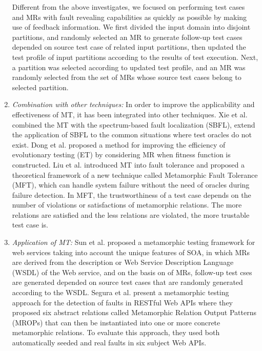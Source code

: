 \documentclass[conference]{IEEEtran}
\theoremstyle{remark}
\begin{document}
\begin{enumerate}[1]
  Different from the above investigates, we focused on performing test cases and MRs with fault revealing capabilities as quickly as possible by making use of feedback information. We first divided the input domain into disjoint partitions, and randomly selected an MR to generate follow-up test cases depended on source test case of related input partitions, then updated the test profile of input partitions according to the results of test execution. Next, a partition was selected according to updated test profile, and an MR was randomly selected from the set of MRs whose source test cases belong to selected partition.
  \item
  \emph{Combination with other techniques:} In order to improve the applicability and effectiveness of MT, it has been integrated into other techniques.
  Xie et al. \cite{xie2013metamorphic} combined the MT with the spectrum-based fault localization (SBFL), extend the application of SBFL to the common situations where test oracles do not exist.
  Dong et al. \cite{dong2010security} proposed a method for improving the efficiency of evolutionary testing (ET) by considering MR when fitness function is constructed.
  Liu et al. \cite{liu2014metamorphic} introduced MT into fault tolerance and proposed a theoretical framework of a new technique called Metamorphic Fault Tolerance (MFT), which can
  handle system failure without the need of oracles during failure detection. In MFT, the trustworthiness of a test case depends on the number of violations or satisfactions of metamorphic relations. The more relations are satisfied and the less relations are violated, the more trustable test case is.
  \item
  \emph{Application of MT:}
  Sun et al. \cite{sun2011metamorphic, sun2012metamorphic} proposed a metamorphic testing framework for web services taking into account the unique features of SOA, in which MRs are derived from the description or Web Service Description Language (WSDL) \cite{sun2011metamorphic} of the Web service, and on the basis on of MRs, follow-up test cses are generated depended on source test cases that are randomly generated according to the WSDL.
  Segura et al. \cite{segura2018metamorphic} present a metamorphic testing approach for the detection of faults in RESTful Web APIs where they proposed six abstract relations called Metamorphic Relation Output Patterns (MROPs) that can then be instantiated into one or more concrete metamorphic relations. To evaluate this approach, they used both automatically seeded and real faults in six subject Web APIs.

\end{enumerate}
\end{document}
